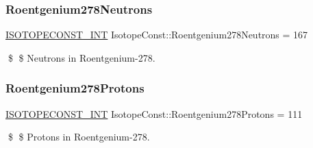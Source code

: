 \subsubsection{\texorpdfstring{Roentgenium278\+Neutrons}{Roentgenium278Neutrons}}
{\footnotesize\ttfamily \mbox{\hyperlink{group___isotope_const-_macros_ga5f18360b3e99483a35c32d789e62621c}{I\+S\+O\+T\+O\+P\+E\+C\+O\+N\+S\+T\+\_\+\+I\+NT}} Isotope\+Const\+::\+Roentgenium278\+Neutrons = 167}

\$ \$ Neutrons in Roentgenium-\/278. \mbox{\label{group___isotope_const-_roentgenium-_rg278_ga454dd4adfc3c8517be2b254ea65e2295}} 
\subsubsection{\texorpdfstring{Roentgenium278\+Protons}{Roentgenium278Protons}}
{\footnotesize\ttfamily \mbox{\hyperlink{group___isotope_const-_macros_ga5f18360b3e99483a35c32d789e62621c}{I\+S\+O\+T\+O\+P\+E\+C\+O\+N\+S\+T\+\_\+\+I\+NT}} Isotope\+Const\+::\+Roentgenium278\+Protons = 111}

\$ \$ Protons in Roentgenium-\/278. 